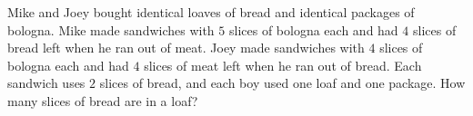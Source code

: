 Mike and Joey bought identical loaves of bread and identical packages of bologna. Mike made sandwiches with $5$ slices of bologna each and had $4$ slices of bread left when he ran out of meat. Joey made sandwiches with $4$ slices of bologna each and had $4$ slices of meat left when he ran out of bread. Each sandwich uses $2$ slices of bread, and each boy used one loaf and one package. How many slices of bread are in a loaf?
